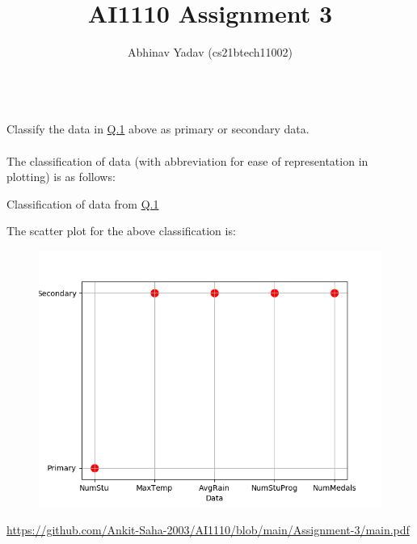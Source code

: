 \documentclass[journal,12pt,twocolumn]{IEEEtran}
\begin{document}
    \newcommand*{\permcomb}[4][0mu]{{{}^{#3}\mkern#1#2_{#4}}}
    \newcommand*{\perm}[1][-3mu]{\permcomb[#1]{P}}
    \newcommand*{\comb}[1][-1mu]{\permcomb[#1]{C}}
    \makeatletter
    \makeatother
    \let\StandardTheFigure\thefigure
    \let\vec\mathbf
    \def\putbox#1#2#3{\makebox[0in][l]{\makebox[#1][l]{}\raisebox{\baselineskip}[0in][0in]{\raisebox{#2}[0in][0in]{#3}}}}
        \def\rightbox#1{\makebox[0in][r]{#1}}
        \def\centbox#1{\makebox[0in]{#1}}
        \def\topbox#1{\raisebox{-\baselineskip}[0in][0in]{#1}}
        \def\midbox#1{\raisebox{-0.5\baselineskip}[0in][0in]{#1}}
    \vspace{3cm}
    \title{AI1110 Assignment 3}
    \author{Abhinav Yadav (cs21btech11002)}
    \maketitle
    \newpage

    \\
    Classify the data in \href{https://github.com/Ankit-Saha-2003/AI1110/blob/main/Assignment-3/main.pdf}{Q.1} 
    above as primary or secondary data.\\

    \solution\\
    \noindent The classification of data\cite{AsData} (with abbreviation for ease of representation in plotting) is as follows:\\
 
    \begin{table}[ht!]
        
        \caption{Classification of data from \href{https://github.com/Ankit-Saha-2003/AI1110/blob/main/Assignment-3/main.pdf}{Q.1}}
        \label{table:classification}
    \end{table}

    \noindent The scatter plot for the above classification is:
    \begin{figure}[ht!]
        \includegraphics[width=\columnwidth]{figs/plot.png}
        \caption{}
        \label{fig:plot}
    \end{figure}


    \begin{thebibliography}{1}

            \href{https://github.com/Ankit-Saha-2003/AI1110/blob/main/Assignment-3/main.pdf}
                {https://github.com/Ankit-Saha-2003/AI1110/blob/main/Assignment-3/main.pdf}
        
    \end{thebibliography}
\end{document}
